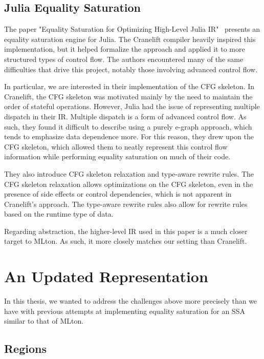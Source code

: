 \documentclass{article}
\begin{document}
\subsection{Julia Equality Saturation}

The paper "Equality Saturation for Optimizing High-Level Julia IR"~\cite{merckx2025equalitysaturationoptimizinghighlevel} presents an equality saturation engine for Julia. The Cranelift compiler heavily inspired this implementation, but it helped formalize the approach and applied it to more structured types of control flow. The authors encountered many of the same difficulties that drive this project, notably those involving advanced control flow.

In particular, we are interested in their implementation of the CFG skeleton. In Cranelift, the CFG skeleton was motivated mainly by the need to maintain the order of stateful operations. However, Julia had the issue of representing multiple dispatch in their IR. Multiple dispatch is a form of advanced control flow. As such, they found it difficult to describe using a purely e-graph approach, which tends to emphasize data dependence more. For this reason, they drew upon the CFG skeleton, which allowed them to neatly represent this control flow information while performing equality saturation on much of their code.

They also introduce CFG skeleton relaxation and type-aware rewrite rules. The CFG skeleton relaxation allows optimizations on the CFG skeleton, even in the presence of side effects or control dependencies, which is not apparent in Cranelift's approach. The type-aware rewrite rules also allow for rewrite rules based on the runtime type of data.

Regarding abstraction, the higher-level IR used in this paper is a much closer target to MLton. As such, it more closely matches our setting than Cranelift.



\section{An Updated Representation}

In this thesis, we wanted to address the challenges above more precisely than we have with previous attempts at implementing equality saturation for an SSA similar to that of MLton.


\subsection{Regions}
\end{document}
